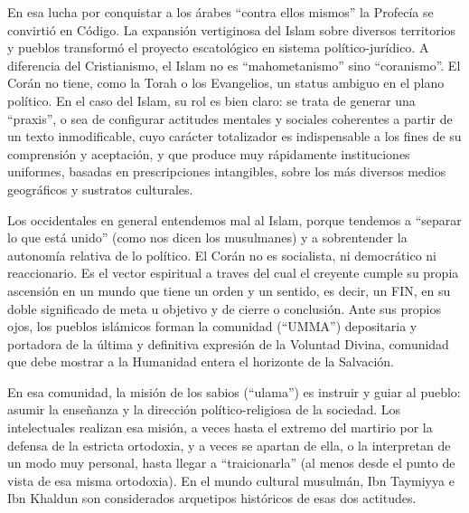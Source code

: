 \documentclass[
]{book}
\begin{document}
En esa lucha por conquistar a los árabes ``contra ellos mismos'' la Profecía se convirtió en Código. La expansión vertiginosa del Islam sobre diversos territorios y pueblos transformó el proyecto escatológico en sistema político-jurídico. A diferencia del Cristianismo, el Islam no es ``mahometanismo'' sino ``coranismo''. El Corán no tiene, como la Torah o los Evangelios, un status ambiguo en el plano político. En el caso del Islam, su rol es bien claro: se trata de generar una ``praxis'', o sea de configurar actitudes mentales y sociales coherentes a partir de un texto inmodificable, cuyo carácter totalizador es indispensable a los fines de su comprensión y aceptación, y que produce muy rápidamente instituciones uniformes, basadas en prescripciones intangibles, sobre los más diversos medios geográficos y sustratos culturales.

Los occidentales en general entendemos mal al Islam, porque tendemos a ``separar lo que está unido'' (como nos dicen los musulmanes) y a sobrentender la autonomía relativa de lo político. El Corán no es socialista, ni democrático ni reaccionario. Es el vector espiritual a traves del cual el creyente cumple su propia ascensión en un mundo que tiene un orden y un sentido, es decir, un FIN, en su doble significado de meta u objetivo y de cierre o conclusión. Ante sus propios ojos, los pueblos islámicos forman la comunidad (``UMMA'') depositaria y portadora de la última y definitiva expresión de la Voluntad Divina, comunidad que debe mostrar a la Humanidad entera el horizonte de la Salvación.

En esa comunidad, la misión de los sabios (``ulama'') es instruir y guiar al pueblo: asumir la enseñanza y la dirección político-religiosa de la sociedad. Los intelectuales realizan esa misión, a veces hasta el extremo del martirio por la defensa de la estricta ortodoxia, y a veces se apartan de ella, o la interpretan de un modo muy personal, hasta llegar a ``traicionarla'' (al menos desde el punto de vista de esa misma ortodoxia). En el mundo cultural musulmán, Ibn Taymiyya e Ibn Khaldun son considerados arquetipos históricos de esas dos actitudes.
\end{document}
